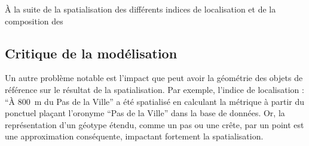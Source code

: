 À la suite de la spatialisation des différents indices de localisation
et de la composition des 

\subsection{Critique de la modélisation}
\label{subsec:9-2-3}


Un autre problème notable est l'impact que peut avoir la géométrie des
objets de référence sur le résultat de la spatialisation. Par exemple,
l'indice de localisation : \enquote{À \SI{800}{\meter} du Pas de la
  Ville} a été spatialisé en calculant la métrique
 à partir du ponctuel plaçant l'oronyme
\enquote{Pas de la Ville} dans la base de données. Or, la
représentation d'un géotype étendu, comme un pas ou une crête, par un
point est une approximation conséquente, impactant fortement la
spatialisation.

